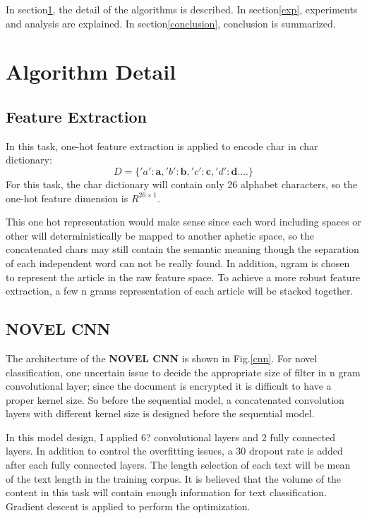 \documentclass[a4paper]{article}
\begin{document}
In section\ref{algoDetail}, the detail of the algorithms is described. In section\ref{exp}, experiments and analysis are explained. In section\ref{conclusion}, conclusion is summarized.

\section{Algorithm Detail}\label{algoDetail}

\subsection{Feature Extraction}
In this task, one-hot feature extraction is applied to encode char in char dictionary:
\begin{equation}
D = \{'a': \mathbf{a},'b': \mathbf{b},'c': \mathbf{c},'d': \mathbf{d}....\}
\end{equation}
For this task, the char dictionary will contain only 26 alphabet characters, so the one-hot feature dimension is $R^{26 \times 1}$.

This one hot representation would make sense since each word including spaces or other will deterministically be mapped to another aphetic space, so the concatenated chars may still contain the semantic meaning though the separation of each independent word can not be really found. In addition, ngram is chosen to represent the article in the raw feature space. To achieve a more robust feature extraction, a few n grams representation of each article will be stacked together.

\subsection{NOVEL CNN}
The architecture of the \textbf{NOVEL CNN} is shown in Fig.\ref{cnn}. For novel classification, one uncertain issue to decide the appropriate size of filter in n gram convolutional layer; since the document is encrypted it is difficult to have a proper kernel size. So before the sequential model, a concatenated convolution layers with different kernel size is designed before the sequential model.

In this model design, I applied 6? convolutional layers and 2 fully connected layers. In addition to control the overfitting issues, a $30$ dropout rate is added after each fully connected layers. The length selection of each text will be mean of the text length in the training corpus. It is believed that the volume of the content in this task will contain enough information for text classification. Gradient descent is applied to perform the optimization.
\end{document}
